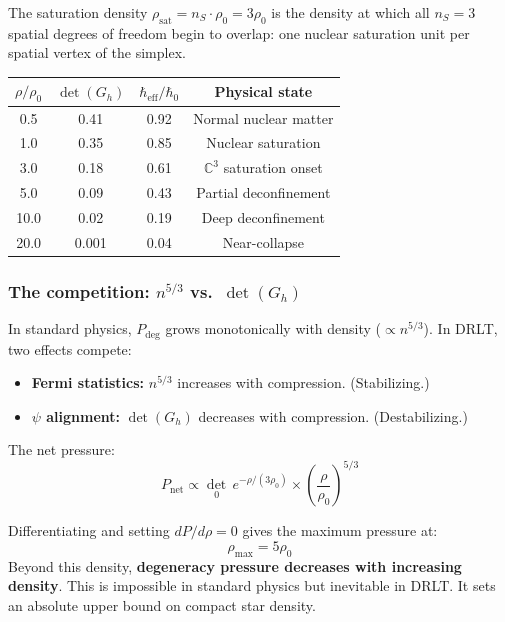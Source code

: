 \documentclass[12pt]{article}
\theoremstyle{remark}
\theoremstyle{definition}
\newcommand{\CC}{\mathbb{C}}
\begin{document}
The saturation density $\rho_\text{sat} = n_S \cdot \rho_0 = 3\rho_0$ is the density at which all $n_S = 3$ spatial degrees of freedom begin to overlap: one nuclear saturation unit per spatial vertex of the simplex.

\begin{center}
\begin{tabular}{cccc}
\hline
$\rho/\rho_0$ & $\det(G_h)$ & $\hbar_\text{eff}/\hbar_0$ & Physical state \\
\hline
0.5 & 0.41 & 0.92 & Normal nuclear matter \\
1.0 & 0.35 & 0.85 & Nuclear saturation \\
3.0 & 0.18 & 0.61 & $\CC^3$ saturation onset \\
5.0 & 0.09 & 0.43 & Partial deconfinement \\
10.0 & 0.02 & 0.19 & Deep deconfinement \\
20.0 & 0.001 & 0.04 & Near-collapse \\
\hline
\end{tabular}
\end{center}

\subsubsection{The competition: $n^{5/3}$ vs.\ $\det(G_h)$}

In standard physics, $P_\text{deg}$ grows monotonically with density ($\propto n^{5/3}$). In DRLT, two effects compete:
\begin{itemize}
\item \textbf{Fermi statistics:} $n^{5/3}$ increases with compression. (Stabilizing.)
\item \textbf{$\psi$ alignment:} $\det(G_h)$ decreases with compression. (Destabilizing.)
\end{itemize}

The net pressure:
\begin{equation}
P_\text{net} \propto \det_0\,e^{-\rho/(3\rho_0)} \times \left(\frac{\rho}{\rho_0}\right)^{5/3}
\end{equation}

Differentiating and setting $dP/d\rho = 0$ gives the maximum pressure at:
\begin{equation}
\rho_\text{max} = 5\rho_0
\end{equation}
Beyond this density, \textbf{degeneracy pressure decreases with increasing density}. This is impossible in standard physics but inevitable in DRLT. It sets an absolute upper bound on compact star density.
\end{document}
